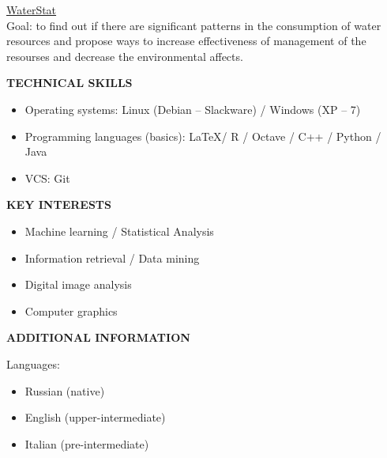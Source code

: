 \documentclass[a4paper,12pt,fullpage]{article}
\begin{document}
\underline{WaterStat}\\
Goal: to find out if there are significant patterns in the consumption of water resources and propose ways to increase effectiveness of management of the resourses and decrease the environmental affects.\\
\begin{center}
	\textbf{TECHNICAL SKILLS}
\end{center}
\begin{itemize}
	\item Operating systems: Linux (Debian -- Slackware) / Windows (XP -- 7)
	\item Programming languages (basics): \LaTeX / R / Octave / C++ / Python / Java 
	\item VCS: Git
\end{itemize}

\begin{center}
	\textbf{KEY INTERESTS}
\end{center}
\begin{itemize}
	\item Machine learning / Statistical Analysis
	\item Information retrieval / Data mining
	\item Digital image analysis
	\item Computer graphics
\end{itemize}

\begin{center}
	\textbf{ADDITIONAL INFORMATION}
\end{center}
Languages: 
\begin{itemize}
	\item Russian (native)
	\item English (upper-intermediate)
	\item Italian (pre-intermediate)
\end{itemize}

\end{document}
